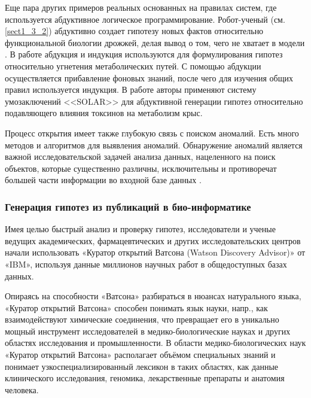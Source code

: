 Еще пара других примеров реальных основанных на правилах систем, где используется абдуктивное логическое 
программирование. Робот-ученый (см. \cref{sect1_3_2}) абдуктивно создает гипотезу новых фактов относительно 
функциональной биологии дрожжей, делая вывод о том, чего не хватает в модели \cite{King2011}. В работе 
\cite{TamaddoniNezhad2006} абдукция и индукция используются для формулирования гипотез относительно угнетения 
метаболических путей. С помощью абдукции осуществляется прибавление фоновых знаний, после чего для изучения общих 
правил используется индукция. В работе \cite{Inoue2009} авторы применяют систему умозаключений <<SOLAR>> для 
абдуктивной генерации гипотез относительно подавляющего влияния токсинов на метаболизм крыс.

Процесс открытия имеет также глубокую связь с поиском аномалий. Есть много методов и алгоритмов для выявления аномалий. 
Обнаружение аномалий является важной исследовательской задачей анализа данных, нацеленного на поиск объектов, которые 
существенно различны, исключительны и противоречат большей части информации во входной базе данных \cite{Bartha2013}.


\subsubsection{Генерация гипотез из публикаций в био-информатике}\label{sect1_2_5_3}
Имея целью быстрый анализ и проверку гипотез, исследователи и ученые ведущих академических, фармацевтических и 
других исследовательских центров начали использовать «Куратор открытий Ватсона (Watson Discovery Advisor)» от «IBM», 
используя данные миллионов научных работ в общедоступных базах данных. 

Опираясь на способности «Ватсона» разбираться в нюансах натурального языка, «Куратор открытий Ватсона» способен 
понимать язык науки, напр., как взаимодействуют химические соединения, что превращает его в уникально мощный инструмент 
исследователей в медико-биологические науках и других областях исследования и промышленности. В области 
медико-биологических наук «Куратор открытий Ватсона» располагает объёмом специальных знаний и понимает 
узкоспециализированный лексикон в таких областях, как данные клинического исследования, геномика, лекарственные 
препараты и анатомия человека.

